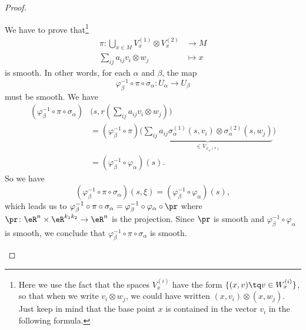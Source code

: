 \begin{proof}
\begin{subproof}
		We have to prove that\footnote{Here we use the fact that the spaces \( V_x^{(i)}\) have the form \( \{ (x,v)\tq v\in W_x^{(i)} \}\), so that when we write \( v_i\otimes w_j\), we could have written \( (x,v_i)\otimes (x,w_j)\). Just keep in mind that the base point \( x\) is contained in the vector \( v_i\) in the following formula.}
		\begin{equation}
			\begin{aligned}
				\pi\colon \bigcup_{x\in M}V_x^{(1)}\otimes V_x^{(2)} & \to M     \\
				\sum_{ij}a_{ij}v_i\otimes w_j                        & \mapsto x
			\end{aligned}
		\end{equation}
		is smooth. In other words, for each \( \alpha\) and \( \beta\), the map
		\begin{equation}
			\varphi_{\beta}^{-1}\circ \pi\circ \sigma_{\alpha} \colon U_{\alpha}\to U_{\beta}
		\end{equation}
		must be smooth. We have
		\begin{subequations}
			\begin{align}
				(\varphi_{\beta}^{-1}\circ\pi\circ\sigma_{\alpha}) & \big( s,r(\sum_{ij}a_{ij}v_i\otimes w_j) \big)                                                                                                                        \\
				                                                   & =(\varphi_{\beta}^{-1}\circ\pi)\Big( \underbrace{\sum_{ij}a_{ij}\sigma_{\alpha}^{(1)}(s,v_i)\otimes \sigma_{\alpha}^{(2)}(s,w_j)}_{\in V_{\varphi_{\alpha}(s)}} \Big) \\
				                                                   & =(\varphi_{\beta}^{-1}\circ\varphi_{\alpha})(s).
			\end{align}
		\end{subequations}
		So we have
		\begin{equation}
			(\varphi_{\beta}^{-1}\circ\pi\circ\sigma_{\alpha})(s,\xi)=(\varphi_{\beta}^{-1}\circ\varphi_{\alpha})(s),
		\end{equation}
		which leads us to \( \varphi_{\beta}^{-1}\circ\pi\circ\sigma_{\alpha}=\varphi_{\beta}^{-1}\circ\varphi_{\alpha}\circ\pr\) where \(\pr \colon \eR^n\times \eR^{k_1k_2}\to \eR^n  \) is the projection. Since \( \pr\) is smooth and \( \varphi_{\beta}^{-1}\circ\varphi_{\alpha}\) is smooth, we conclude that \( \varphi_{\beta}^{-1}\circ\pi\circ\sigma_{\alpha}\) is smooth.


\end{subproof}
\end{proof}
